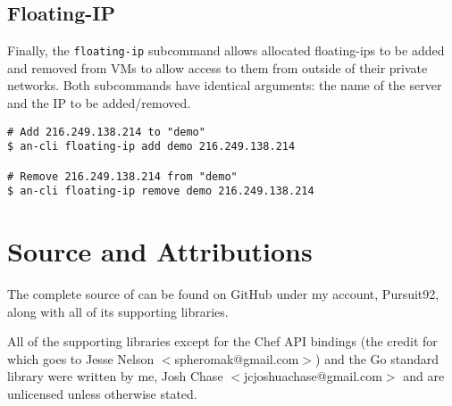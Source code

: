 \documentclass[11pt]{article}
\begin{document}
\subsection{Floating-IP}

Finally, the \texttt{floating-ip} subcommand allows allocated
floating-ips to be added and removed from VMs to allow access to them
from outside of their private networks. Both subcommands have identical
arguments: the name of the server and the IP to be added/removed.

\begin{lstlisting}
# Add 216.249.138.214 to "demo"
$ an-cli floating-ip add demo 216.249.138.214

# Remove 216.249.138.214 from "demo"
$ an-cli floating-ip remove demo 216.249.138.214
\end{lstlisting}

\section{Source and Attributions}

The complete source of \aN can be found on GitHub under my account,
Pursuit92, along with all of its supporting libraries.

All of the supporting libraries except for the Chef API bindings (the
credit for which goes to Jesse Nelson $<$spheromak@gmail.com$>$) and the Go
standard library were written by me, Josh Chase
$<$jcjoshuachase@gmail.com$>$ and are unlicensed unless otherwise stated.
\end{document}
